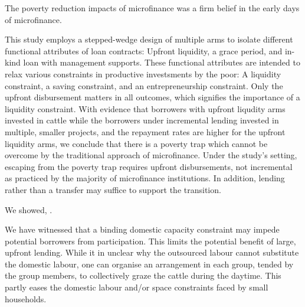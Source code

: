 	The poverty reduction impacts of microfinance was a firm belief in the early days of microfinance. 

	This study employs a stepped-wedge design of multiple arms to isolate different functional attributes of loan contracts: Upfront liquidity, a grace period, and in-kind loan with management supports. These functional attributes are intended to relax various constraints in productive investsments by the poor: A liquidity constraint, a saving constraint, and an entrepreneurship constraint. Only the upfront disbursement matters in all outcomes, which signifies the importance of a liquidity constraint. With evidence that borrowers with upfront liqudity arms invested in cattle while the borrowers under incremental lending invested in multiple, smaller projects, and the repayment rates are higher for the upfront liquidity arms, we conclude that there is a poverty trap which cannot be overcome by the traditional approach of microfinance. Under the study's setting, escaping from the poverty trap requires upfront disbursements, not incremental as practiced by the majority of microfinance institutions. In addition, lending rather than a transfer may suffice to support the transition. 

	We showed,  {\citep{CullMorduch2018, BueraKaboskiShin2020}}.

	We have witnessed that a binding domestic capacity constraint may impede potential borrowers from participation. This limits the potential benefit of large, upfront lending.  While it in unclear why the outsourced labour cannot substitute the domestic labour, one can organise an arrangement in each group, tended by the group members, to collectively graze the cattle during the daytime. This partly eases the domestic labour and/or space constraints faced by small households. 

